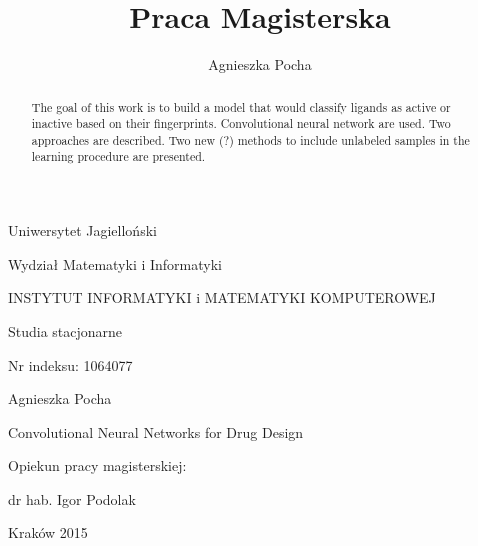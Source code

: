 \documentclass[a4paper,10pt]{report}
\title{Praca Magisterska}
\author{Agnieszka Pocha}
\newenvironment{bottompar}{\par\vspace*{\fill}}{\clearpage}
\begin{document}
  \begin{center}
    Uniwersytet Jagielloński
    
    Wydział Matematyki i Informatyki
    
    INSTYTUT INFORMATYKI i MATEMATYKI KOMPUTEROWEJ
    
    Studia stacjonarne 
  \end{center}
  Nr indeksu: 1064077  
  
  \begin{center}
   Agnieszka Pocha 
   
   \large Convolutional Neural Networks for Drug Design 
  \end{center}
  \begin{flushright}
    Opiekun pracy magisterskiej:
    
    dr hab. Igor Podolak 
  \end{flushright}

  \begin{bottompar}
  \begin{center}
   \large Kraków 2015
  \end{center}
  \end{bottompar}

  
  \begin{abstract}
    The goal of this work is to build a model that would classify ligands as active or inactive based on their fingerprints. Convolutional neural network are used. Two approaches are described. Two new (?) methods to include unlabeled samples in the learning procedure are presented.
  \end{abstract}
  
  \tableofcontents\vfill\eject
    
  
\end{document}
